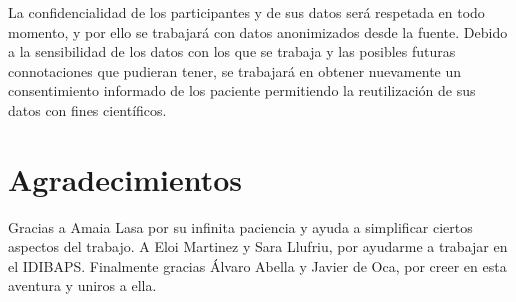\documentclass[fleqn,12pt]{UICArticle} %
\begin{document}
La confidencialidad de los participantes y de sus datos será respetada en todo momento, y por ello se trabajará con datos anonimizados desde la fuente. Debido a la sensibilidad de los datos con los que se trabaja y las posibles futuras connotaciones que pudieran tener, se trabajará en obtener nuevamente un consentimiento informado de los paciente permitiendo la reutilización de sus datos con fines científicos.


\section*{Agradecimientos}
Gracias a Amaia Lasa por su infinita paciencia y ayuda a simplificar ciertos aspectos del trabajo. A Eloi Martinez y Sara Llufriu, por ayudarme a trabajar en el IDIBAPS. Finalmente gracias Álvaro Abella y Javier de Oca, por creer en esta aventura y uniros a ella.
\endgroup






\end{document}
